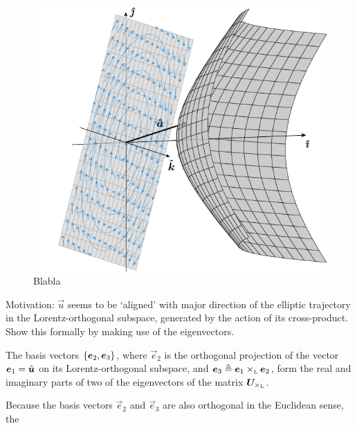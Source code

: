 \begin{figure}[ht]
    \centering
    \includegraphics[scale=1]{media/other/cross_product.pdf}
    \caption{Blabla}
    \label{fig:cross_product}
\end{figure}

Motivation: $\vec{u}$ seems to be `aligned' with major direction of the elliptic trajectory in the Lorentz-orthogonal subspace, generated by the action of its cross-product. Show this formally by making use of the eigenvectors.

The basis vectors $ \qty{\vec{e}_2, \vec{e}_3}$, where $\vec{e}_2$ is the orthogonal projection of the vector $\vec{e}_1 = \uvec{u}$ on its Lorentz-orthogonal subspace, and $\vec{e}_3 \triangleq \lorcrossp{\vec{e}_1}{\vec{e}_2}$, form the real and imaginary parts of two of the eigenvectors of the matrix $\mat{U}_{\lorcrossp{}{}}$. 

Because the basis vectors $\vec{e}_2$ and $\vec{e}_3$ are also orthogonal in the Euclidean sense, the 

